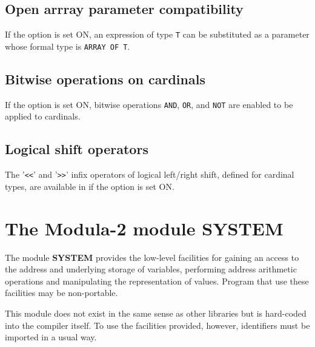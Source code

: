 \subsection{Open arrray parameter compatibility}

If the option  is set ON, an expression of type \verb'T' 
can be substituted as a parameter whose formal type is \verb'ARRAY OF T'. 

\subsection{Bitwise operations on cardinals}

If the option  is set ON, bitwise operations 
\verb'AND', \verb'OR', and \verb'NOT' are enabled to be applied to cardinals.

\subsection{Logical shift operators}

The '\verb'<<'' and '\verb'>>'' infix operators of logical
left/right shift, defined for cardinal types, are available in
\XDS{} if the option  is set ON.

\fi %


\section{The Modula-2 module SYSTEM}
\label{m2:ISO:system}

The module {\bf SYSTEM} provides the low-level facilities for
gaining an access to the address and underlying storage of
variables, performing address arithmetic operations and
manipulating the representation of values. Program that use
these facilities may be non-portable.

This module does not exist in the same sense as other libraries
but is hard-coded into the compiler itself. To use the facilities
provided, however, identifiers must be imported in a usual way.

